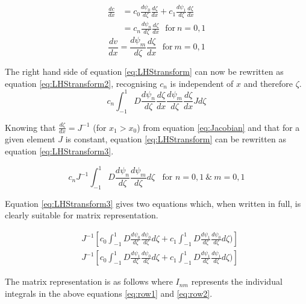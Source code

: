 \documentclass[11pt]{article}
\begin{document}
\begin{align}\label{eq:LagrangeDC}
\frac{dc}{dx} &= c_{0}\frac{d\psi_{0}}{d\zeta}\frac{d\zeta}{dx} + c_1\frac{d\psi_{1}}{d\zeta}\frac{d\zeta}{dx}\\
 &= c_n\frac{d\psi_{n}}{d\zeta}\frac{d\zeta}{dx} \label{eq:LagrangeDC} \ \ \ \text{for} \ n =0,1 \nonumber
\end{align}
\begin{equation}
\label{eq:LagrangeDV} 
\frac{dv}{dx} = \frac{d\psi_{m}}{d\zeta}\frac{d\zeta}{dx} \ \ \ \text{for} \ m =0,1 
\end{equation}

The right hand side of equation \ref{eq:LHStransform} can now be rewritten as equation \ref{eq:LHStransform2}, recognising $c_n$ is independent of $x$ and therefore $\zeta$.
\begin{equation} \label{eq:LHStransform2}
 c_n\int_{-1}^{1} D \frac{d\psi_{n}}{d\zeta}\frac{d\zeta}{dx} \frac{d\psi_{m}}{d\zeta}\frac{d\zeta}{dx} J d\zeta
\end{equation}

Knowing that $\frac{d\zeta}{dx} = J^{-1}$ (for $x_1 > x_0$) from equation \ref{eq:Jacobian} and that for a given element $J$ is constant, equation \ref{eq:LHStransform} can be rewritten as equation \ref{eq:LHStransform3}.

\begin{equation} \label{eq:LHStransform3}
 c_nJ^{-1}\int_{-1}^{1} D \frac{d\psi_{n}}{d\zeta}\frac{d\psi_{m}}{d\zeta} d\zeta \ \ \ \ \text{for \ } n= 0,1 \ \text{\&}  \ m = 0,1
\end{equation}


Equation \ref{eq:LHStransform3} gives two equations which, when written in full, is clearly suitable for matrix representation.

\begin{subequations}
\label{eq:matrixform}
\begin{align}
&J^{-1} \left  [c_0 \int_{-1}^{1} D \frac{d\psi_{0}}{d\zeta} \frac{d\psi_{0}}{d \zeta} d \zeta + c_1 \int_{-1}^{1} D \frac{d\psi_{1}}{d\zeta} \frac{d\psi_{0}}{d\zeta}d\zeta ) \right ] \label{eq:row1} \\
&J^{-1} \left  [ c_0 \int_{-1}^{1} D \frac{d\psi_{1}}{d\zeta} \frac{d\psi_{0}}{d \zeta} d \zeta + c_1 \int_{-1}^{1} D \frac{d\psi_{1}}{d\zeta} \frac{d\psi_{1}}{d\zeta}d\zeta ) \right ] \label{eq:row2} 
\end{align}
\end{subequations}

The matrix representation is as follows where $I_{nm}$ represents the individual integrals in the above equations \ref{eq:row1} and \ref{eq:row2}. 
\end{document}
